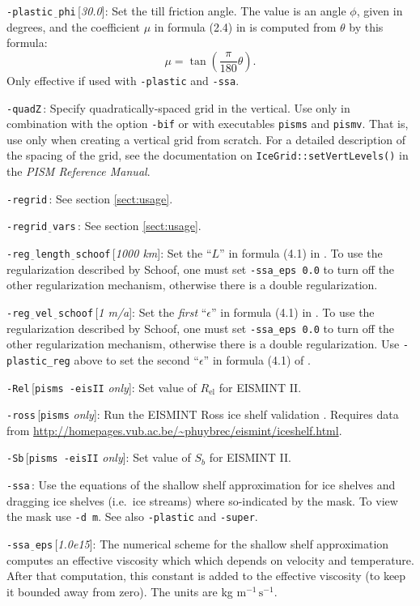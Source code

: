 \documentclass[11pt,final]{amsart}
\newcommand{\eps}{\epsilon}
\newcommand{\rawopt}[1]{\vspace{1mm}\noindent \large\texttt{-#1}\normalsize}
\newcommand{\opt}[1]{\rawopt{#1}\,:\quad}
\newcommand{\optdef}[2]{\rawopt{#1}\,[\textsl{#2}]:\quad}
\newcommand{\optrestrict}[2]{\rawopt{#1}\,[\texttt{#2} \textsl{only}]:\quad}
\newcommand{\und}{$\underline{\,\,\,}$}
\begin{document}
\optdef{plastic\und phi}{30.0}  Set the till friction angle.  The value is an angle $\phi$, given in degrees, and the coefficient $\mu$ in formula (2.4) in \cite{SchoofStream} is computed from $\theta$ by this formula:
	$$\mu = \tan\left(\frac{\pi}{180} \theta\right).$$
Only effective if used with \verb|-plastic| and \verb|-ssa|.

\opt{quadZ}  Specify quadratically-spaced grid in the vertical.  Use only in combination with the option \verb|-bif| or with executables \verb|pisms| and \verb|pismv|.  That is, use only when creating a vertical grid from scratch.  For a detailed description of the spacing of the grid, see the documentation on \verb|IceGrid::setVertLevels()| in the \emph{PISM Reference Manual}.

\opt{regrid}  See section \ref{sect:usage}.

\opt{regrid\und vars}  See section \ref{sect:usage}.

\optdef{reg\und length\und schoof}{1000 km}  Set the ``$L$'' in formula (4.1) in \cite{SchoofStream}.  To use the regularization described by Schoof, one must set \verb|-ssa_eps 0.0| to turn off the other regularization mechanism, otherwise there is a double regularization.

\optdef{reg\und vel\und schoof}{1 m/a}  Set the \emph{first} ``$\eps$'' in formula (4.1) in \cite{SchoofStream}.  To use the regularization described by Schoof, one must set \verb|-ssa_eps 0.0| to turn off the other regularization mechanism, otherwise there is a double regularization.  Use \verb|-plastic_reg| above to set the second ``$\eps$'' in formula (4.1) of \cite{SchoofStream}.

\optrestrict{Rel}{pisms -eisII}    Set value of $R_{\text{el}}$ for EISMINT II.

\optrestrict{ross}{pisms}    Run the EISMINT Ross ice shelf validation \cite{MacAyealetal}.  Requires data from \url{http://homepages.vub.ac.be/~phuybrec/eismint/iceshelf.html}.

\optrestrict{Sb}{pisms -eisII}    Set value of $S_b$ for EISMINT II.

\opt{ssa}  Use the equations of the shallow shelf approximation \cite{MacAyeal,Morland,SchoofStream,WeisGreveHutter} for ice shelves and dragging ice shelves (i.e.~ice streams) where so-indicated by the mask.  To view the mask use \verb|-d m|.  See also \verb|-plastic| and \verb|-super|.

\optdef{ssa\und eps}{1.0e15}  The numerical scheme for the shallow shelf approximation  \cite{WeisGreveHutter} computes an effective viscosity which which depends on velocity and temperature.  After that computation, this constant is added to the effective viscosity (to keep it bounded away from zero).  The units are kg $\text{m}^{-1}\,\text{s}^{-1}$. 
\end{document}
